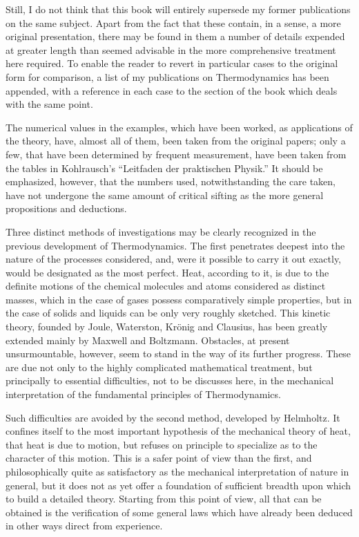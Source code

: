 \documentclass[oneside,12pt]{book}
\begin{document}
Still, I do not think that this book will entirely supersede my former publications on the same subject. Apart from the fact that these contain, in a sense, a more original presentation, there may be found in them a number of details expended at greater length than seemed advisable in the more comprehensive treatment here required. To enable the reader to revert in particular cases to the original form for comparison, a list of my publications on Thermodynamics has been appended, with a reference in each case to the section of the book which deals with the same point. \par 

The numerical values in the examples, which have been worked, as applications of the theory, have, almost all of them, been taken from the original papers; only a few, that have been determined by frequent measurement, have been taken from the tables in Kohlrausch's ``Leitfaden der praktischen Physik.'' It should be emphasized, however, that the numbers used, notwithstanding the care taken, have not undergone the same amount of critical sifting as the more general propositions and deductions. \par 

Three distinct methods of investigations may be clearly recognized in the previous development of Thermodynamics. The first penetrates deepest into the nature of the processes considered, and, were it possible to carry it out exactly, would be designated as the most perfect. Heat, according to it, is due to the definite motions of the chemical molecules and atoms considered as distinct masses, which in the case of gases possess comparatively simple properties, but in the case of solids and liquids can be only very roughly sketched. This kinetic theory, founded by Joule, Waterston, Kr\"onig and Clausius, has been greatly extended mainly by Maxwell and Boltzmann. Obstacles, at present unsurmountable, however, seem to stand in the way of its further progress. These are due not only to the highly complicated mathematical treatment, but principally to essential difficulties, not to be discusses here, in the mechanical interpretation of the fundamental principles of Thermodynamics. \par 

Such difficulties are avoided by the second method, developed by Helmholtz. It confines itself to the most important hypothesis of the mechanical theory of heat, that heat is due to motion, but refuses on principle to specialize as to the character of this motion. This is a safer point of view than the first, and philosophically quite as satisfactory as the mechanical interpretation of nature in general, but it does not as yet offer a foundation of sufficient breadth upon which to build a detailed theory. Starting from this point of view, all that can be obtained is the verification of some general laws which have already been deduced in other ways direct from experience. \par 
\end{document}
